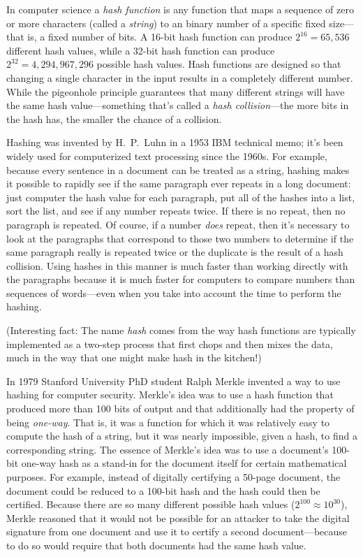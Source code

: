 In computer science a \emph{hash function} is any function that maps a
sequence of zero or more characters (called a \emph{string}) to an
binary number of a specific fixed size---that is, a fixed number of
bits. A 16-bit hash
function can produce $2^{16}=65,536$ different hash values, while a
32-bit hash function can produce $2^{32}=4,294,967,296$ possible hash
values. Hash functions are designed so that changing a single
character in the input results in a completely different number. While
the pigeonhole principle guarantees that many different strings will
have the same hash value---something that's called a \emph{hash
  collision}---the more bits in the hash has, the smaller the chance
of a collision.

Hashing was invented by H.\ P.\ Luhn in a 1953 IBM technical memo;
it's been widely used for computerized text processing since the
1960s. For example, because every sentence in a document can be
treated as a string, hashing makes it possible to rapidly see if the
same paragraph ever repeats in a long document: just computer the hash
value for each paragraph, put all of the hashes into a list, sort the
list, and see if any number repeats twice. If there is no repeat, then
no paragraph is repeated. Of course, if a number \emph{does} repeat,
then it's necessary to look at the paragraphs that correspond to those
two numbers to determine if the same paragraph really is repeated
twice or the duplicate is the result of a hash collision. Using hashes
in this manner is much faster than working directly with the
paragraphs because it is much faster for computers to compare numbers
than sequences of words---even when you take into account the time to
perform the hashing.

(Interesting fact: The name \emph{hash} comes from the way hash functions are typically
implemented as a two-step process that first chops and then mixes the
data, much in the way that one might make hash in the kitchen!)

In 1979 Stanford University PhD student Ralph Merkle invented a way to use
hashing for computer security\citep{merkle:79}. Merkle's idea was to
use a hash
function that produced more than 100 bits of output and that
additionally had the property of being \emph{one-way}. That is, it was
a function for which it was relatively easy to compute the hash of a
string, but it was nearly impossible, given a hash, to find a
corresponding string. The essence of Merkle's idea was to use a
document's 100-bit one-way hash as a stand-in for the document itself
for certain mathematical purposes. For example, instead of digitally
certifying a 50-page document, the document could be reduced to a
100-bit hash and the hash could then be certified. Because there are so many different possible hash values
($2^{100}\approx10^{30}$), Merkle reasoned that it would not be
possible for an attacker to take the digital signature from one document and use it
to certify a second document---because to do so would require that
both documents had the same hash value.

